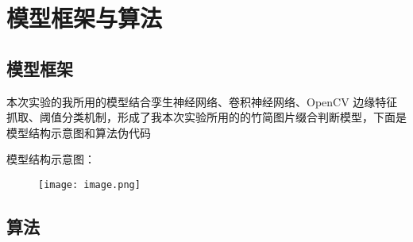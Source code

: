 \documentclass{article}
\begin{document}
\section{模型框架与算法}

\subsection{模型框架}
本次实验的我所用的模型结合孪生神经网络、卷积神经网络、OpenCV 边缘特征抓取、阈值分类机制，形成了我本次实验所用的的竹简图片缀合判断模型，下面是模型结构示意图和算法伪代码

模型结构示意图：
\begin{figure}[H]
\centering
\texttt{[image: image.png]}
\end{figure}

\subsection{算法}
\end{document}
